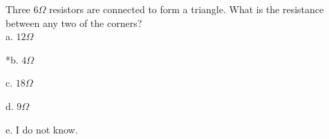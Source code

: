 
Three \( 6 \Omega \) resistors are connected to form a triangle. What is the resistance between any two of the corners?\\

a. \( 12 \Omega \)

*b. \( 4 \Omega \)

c. \( 18 \Omega \) 

d. \( 9 \Omega \)

e. I do not know.\\
